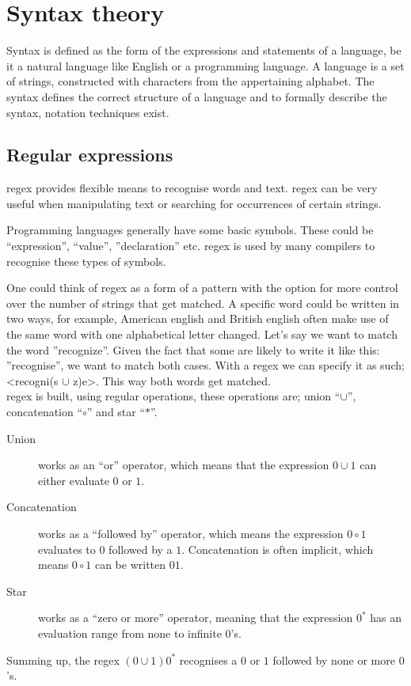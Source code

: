 \section{Syntax theory}
Syntax is defined as the form of the expressions and statements of a language, be it a natural language like English or a programming language. A language is a set of strings, constructed with characters from the appertaining alphabet. The syntax defines the correct structure of a language and to formally describe the syntax, notation techniques exist.

\subsection{Regular expressions}
\ac{regex} provides flexible means to recognise words and text. \ac{regex} can be very useful when manipulating text or searching for occurrences of certain strings.

Programming languages generally have some basic symbols. These could be ``expression'', ``value'', ''declaration'' etc. \ac{regex} is used by many compilers to recognise these types of symbols.\cite{Fischer2010}

One could think of \ac{regex} as a form of a pattern with the option for more control over the number of strings that get matched. A specific word could be written in two ways, for example, American english and British english often make use of the same word with one alphabetical letter changed. Let's say we want to match the word ''recognize''. Given the fact that some are likely to write it like this: ''recognise'', we want to match both cases. With a \ac{regex} we can specify it as such; <recogni(s $\cup$ z)e>. This way both words get matched.\\

\ac{regex} is built, using regular operations, these operations are; union ``$\cup$'', concatenation ``$\circ$'' and star ``$\ast$''.
\begin{description}
	\item [Union] works as an ``or'' operator, which means that the expression $0 \cup 1$ can either evaluate $0$ or $1$.
	\item [Concatenation] works as a ``followed by'' operator, which means the expression $0 \circ 1$ evaluates to $0$ followed by a $1$. Concatenation is often implicit, which means $0 \circ 1$ can be written $01$.
	\item [Star] works as a ``zero or more'' operator, meaning that the expression $0^{\ast}$ has an evaluation range from none to infinite $0$'s.
\end{description}
Summing up, the \ac{regex} $(0 \cup 1) 0^{\ast}$ recognises a $0$ or $1$ followed by none or more $0$'s. \cite{syntax_book}

